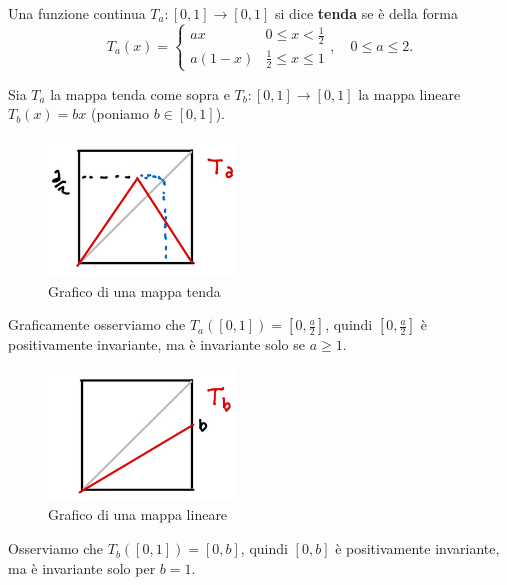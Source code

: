 \begin{definition}
Una funzione continua $T_a:[0,1]\to[0,1]$ si dice \textbf{tenda} se \`e della forma
\[T_a(x)=\begin{cases}
ax & 0\leq x< \frac12\\
a(1-x) & \frac12\leq x\leq 1
\end{cases},\quad 0\leq a\leq 2.\]
\end{definition}

\begin{example}
Sia $T_a$ la mappa tenda come sopra e $T_b:[0,1]\to [0,1]$ la mappa lineare $T_b(x)=bx$ (poniamo $b\in [0,1]$).
\begin{figure}[!htb]
    \centering
    \includegraphics[width=5cm]{Immagini/Insieme_invariante_tenda.png}
    \caption{Grafico di una mappa tenda}
\end{figure}
Graficamente osserviamo che $T_a([0,1])=[0,\frac a2]$, quindi $[0,\frac a2]$ \`e positivamente invariante, ma \`e invariante solo se $a\geq 1$.
\begin{figure}[!htb]
    \centering
    \includegraphics[width=5cm]{Immagini/Insieme_invariante_lineare.png}
    \caption{Grafico di una mappa lineare}
\end{figure}
Osserviamo che $T_b([0,1])=[0,b]$, quindi $[0,b]$ \`e positivamente invariante, ma \`e invariante solo per $b=1$.
\end{example}

